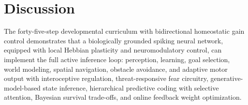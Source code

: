 \documentclass[11pt,a4paper]{article}
\begin{document}
\section{Discussion}\label{sec:discussion}

The forty-five-step developmental curriculum with bidirectional homeostatic
gain control demonstrates that a biologically grounded spiking neural network, equipped with local Hebbian plasticity and
neuromodulatory control, can implement the full active inference loop:
perception, learning, goal selection, world modeling, spatial navigation,
obstacle avoidance, and adaptive motor output with interoceptive regulation,
threat-responsive fear circuitry, generative-model-based state inference,
hierarchical predictive coding with selective attention, Bayesian survival
trade-offs, and online feedback weight optimization.
\end{document}
